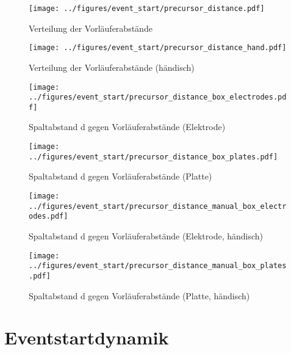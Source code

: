 \begin{figure}[htbp]
    \centering
    \begin{minipage}[t]{0.47\textwidth}
      \centering
      \texttt{[image: ../figures/event\_start/precursor\_distance.pdf]}
      \caption{Verteilung der Vorläuferabstände}
      \label{fig:histogram-precdistance}
   \end{minipage}
 \begin{minipage}[t]{0.47\textwidth}
      \centering
      \texttt{[image: ../figures/event\_start/precursor\_distance\_hand.pdf]}
      \caption{Verteilung der Vorläuferabstände (händisch)}
      \label{fig:histogram-precdistance-hand}
  \end{minipage}
\end{figure}

\begin{figure}[htbp]
    \centering
    \begin{minipage}[t]{0.47\textwidth}
      \centering
      \texttt{[image: ../figures/event\_start/precursor\_distance\_box\_electrodes.pdf]}
      \caption{Spaltabstand d gegen Vorläuferabstände (Elektrode)}
      \label{fig:box-precdistance-electrode}
   \end{minipage}
 \begin{minipage}[t]{0.47\textwidth}
      \centering
      \texttt{[image: ../figures/event\_start/precursor\_distance\_box\_plates.pdf]}
      \caption{Spaltabstand d gegen Vorläuferabstände (Platte)}
      \label{fig:box-precdistance-plate}
  \end{minipage}
\begin{minipage}[t]{0.47\textwidth}
      \centering
      \texttt{[image: ../figures/event\_start/precursor\_distance\_manual\_box\_electrodes.pdf]}
      \caption{Spaltabstand d gegen Vorläuferabstände (Elektrode, händisch)}
      \label{fig:box-precdistance-electrode-hand}
   \end{minipage}
 \begin{minipage}[t]{0.47\textwidth}
      \centering
      \texttt{[image: ../figures/event\_start/precursor\_distance\_manual\_box\_plates.pdf]}
      \caption{Spaltabstand d gegen Vorläuferabstände (Platte, händisch)}
      \label{fig:box-precdistance-plate-hand}
  \end{minipage}

\end{figure}


\section{Eventstartdynamik}


